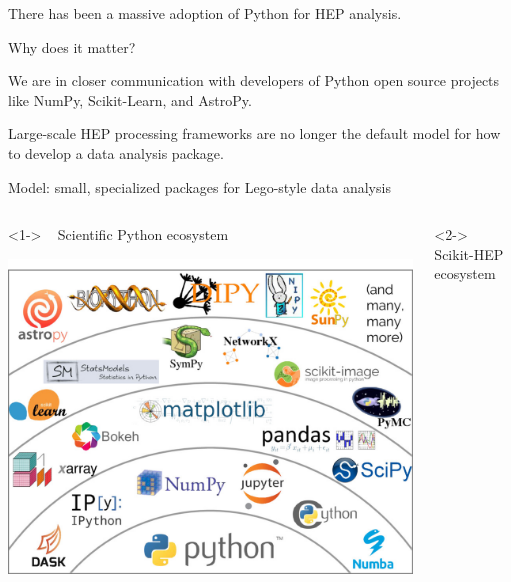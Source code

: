 \documentclass[aspectratio=169]{beamer}
\begin{document}
\begin{frame}{There has been a massive adoption of Python for HEP analysis.}
\large
\vspace{0.35 cm}

{\Large Why does it matter?}

\vspace{0.5 cm}
We are in closer communication with developers of Python open source projects like NumPy, Scikit-Learn, and AstroPy.

\vspace{0.5 cm}
Large-scale HEP processing frameworks are no longer the default model for how to develop a data analysis package.
\end{frame}

\begin{frame}{Model: small, specialized packages for Lego-style data analysis}
\vspace{0.75 cm}
\Large

\begin{columns}
\begin{uncoverenv}<1->
\mbox{ } \hfill Scientific Python ecosystem \hfill \mbox{ }

\includegraphics[width=\linewidth]{PLOTS/shells-border.png}
\end{uncoverenv}

\begin{uncoverenv}<2->
\mbox{ } \hfill Scikit-HEP ecosystem \hfill \mbox{ }


\end{uncoverenv}
\end{columns}
\end{frame}
\end{document}
